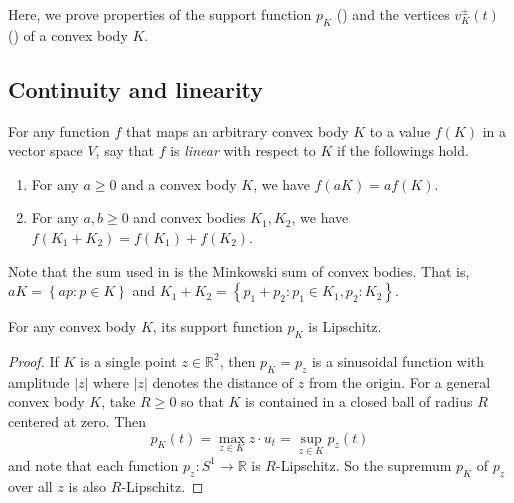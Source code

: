 Here, we prove properties of the support function \(p_K\) () and the vertices \(v_K^{\pm}(t)\) () of a convex body \(K\).

\subsection{Continuity and linearity}

\begin{definition}

For any function \(f\) that maps an arbitrary convex body \(K\) to a value \(f(K)\) in a vector space \(V\), say that \(f\) is \emph{linear} with respect to \(K\) if the followings hold.

\begin{enumerate}
\def\labelenumi{\arabic{enumi}.}
\tightlist
\item
  For any \(a \geq 0\) and a convex body \(K\), we have \(f(aK) = a f(K)\).
\item
  For any \(a, b \geq 0\) and convex bodies \(K_1, K_2\), we have \(f(K_1 + K_2) = f(K_1) + f(K_2)\).
\end{enumerate}

\label{def:convex-body-linear}
\end{definition}

Note that the sum used in  is the Minkowski sum of convex bodies. That is, \(aK = \left\{ ap : p \in K \right\}\) and \(K_1 + K_2 = \left\{ p_1 + p_2 : p_1 \in K_1, p_2 : K_2 \right\}\).

\begin{theorem}

For any convex body \(K\), its support function \(p_K\) is Lipschitz.

\label{thm:support-function-lipschitz}
\end{theorem}

\begin{proof}
If \(K\) is a single point \(z \in \mathbb{R}^{2}\), then \(p_K = p_z\) is a sinusoidal function with amplitude \(|z|\) where \(|z|\) denotes the distance of \(z\) from the origin. For a general convex body \(K\), take \(R \geq 0\) so that \(K\) is contained in a closed ball of radius \(R\) centered at zero. Then
\[
p_K(t) = \max_{z \in K} z \cdot u_t = \sup_{z \in K} p_z(t)
\]
and note that each function \(p_z : S^1 \to \mathbb{R}\) is \(R\)-Lipschitz. So the supremum \(p_K\) of \(p_z\) over all \(z\) is also \(R\)-Lipschitz.
\end{proof}


